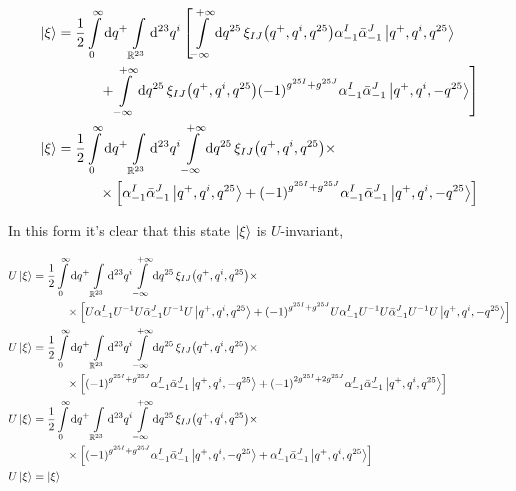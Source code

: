 \begin{align*}
    \ket{\xi}&=\frac12\int\limits_0^\infty\dd{q^+}\int\limits_{\mathbb R^{23}}\dd[23]{q^i}\left[\int\limits_{-\infty}^{+\infty}\dd{q^{25}}\xi_{IJ}\qty(q^+,q^i,q^{25})\alpha^I_{-1}{\bar\alpha}^J_{-1}\ket{q^+,q^i,q^{25}}\right.\\
    &\quad\quad\quad\left.+\int\limits_{-\infty}^{+\infty}\dd{q^{25}}\xi_{IJ}\qty(q^+,q^i,q^{25})\qty(-1)^{g^{25I}+g^{25J}}\alpha^I_{-1}{\bar\alpha}^J_{-1}\ket{q^+,q^i,-q^{25}}\right]\\
    \ket{\xi}&=\frac12\int\limits_0^\infty\dd{q^+}\int\limits_{\mathbb R^{23}}\dd[23]{q^i}\int\limits_{-\infty}^{+\infty}\dd{q^{25}}\xi_{IJ}\qty(q^+,q^i,q^{25})\times\\
    &\quad\quad\quad\times\qty[\alpha^I_{-1}{\bar\alpha}^J_{-1}\ket{q^+,q^i,q^{25}}+\qty(-1)^{g^{25I}+g^{25J}}\alpha^I_{-1}{\bar\alpha}^J_{-1}\ket{q^+,q^i,-q^{25}}]
\end{align*}

In this form it's clear that this state $\ket\xi$ is $U$-invariant,

\begin{align*}
    U\ket{\xi}&=\frac12\int\limits_0^\infty\dd{q^+}\int\limits_{\mathbb R^{23}}\dd[23]{q^i}\int\limits_{-\infty}^{+\infty}\dd{q^{25}}\xi_{IJ}\qty(q^+,q^i,q^{25})\times\\
    &\quad\quad\quad\times\qty[U\alpha^I_{-1}U^{-1}U{\bar\alpha}^J_{-1}U^{-1}U\ket{q^+,q^i,q^{25}}+\qty(-1)^{g^{25I}+g^{25J}}U\alpha^I_{-1}U^{-1}U{\bar\alpha}^J_{-1}U^{-1}U\ket{q^+,q^i,-q^{25}}]\\
    U\ket{\xi}&=\frac12\int\limits_0^\infty\dd{q^+}\int\limits_{\mathbb R^{23}}\dd[23]{q^i}\int\limits_{-\infty}^{+\infty}\dd{q^{25}}\xi_{IJ}\qty(q^+,q^i,q^{25})\times\\
    &\quad\quad\quad\times\qty[\qty(-1)^{g^{25I}+g^{25J}}\alpha^I_{-1}{\bar\alpha}^J_{-1}\ket{q^+,q^i,-q^{25}}+\qty(-1)^{2g^{25I}+2g^{25J}}\alpha^I_{-1}{\bar\alpha}^J_{-1}\ket{q^+,q^i,q^{25}}]\\
    U\ket{\xi}&=\frac12\int\limits_0^\infty\dd{q^+}\int\limits_{\mathbb R^{23}}\dd[23]{q^i}\int\limits_{-\infty}^{+\infty}\dd{q^{25}}\xi_{IJ}\qty(q^+,q^i,q^{25})\times\\
    &\quad\quad\quad\times\qty[\qty(-1)^{g^{25I}+g^{25J}}\alpha^I_{-1}{\bar\alpha}^J_{-1}\ket{q^+,q^i,-q^{25}}+\alpha^I_{-1}{\bar\alpha}^J_{-1}\ket{q^+,q^i,q^{25}}]\\
    U\ket{\xi}&=\ket\xi
\end{align*}

